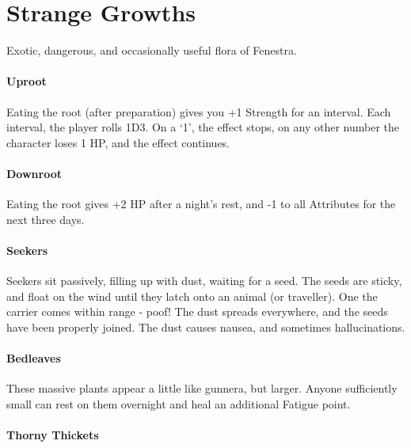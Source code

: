 \chapter{Strange Growths}
\label{plants}

\begin{multicols}{2}

Exotic, dangerous, and occasionally useful flora of Fenestra.

\subsubsection{Uproot}
\label{uproot}

Eating the root (after preparation) gives you +1 Strength for an interval.
Each interval, the player rolls 1D3.
On a `1', the effect stops, on any other number the character loses 1 HP, and the effect continues.

\subsubsection{Downroot}
\label{downroot}

Eating the root gives +2 HP after a night's rest, and -1 to all Attributes for the next three days.

\subsubsection{Seekers}
\label{seekers}

Seekers sit passively, filling up with dust, waiting for a seed.
The seeds are sticky, and float on the wind until they latch onto an animal (or traveller).
One the carrier comes within range - poof!
The dust spreads everywhere, and the seeds have been properly joined.
The dust causes nausea, and sometimes hallucinations.

\subsubsection{Bedleaves}
\label{bedleaves}

These massive plants appear a little like gunnera, but larger.
Anyone sufficiently small can rest on them overnight and heal an additional Fatigue point.

\subsubsection{Thorny Thickets}
\label{thorny_thickets}


\end{multicols}
